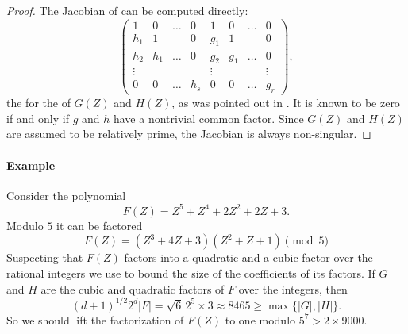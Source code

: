 \begin{proof}
The Jacobian of  can be computed directly:
\[
\left(
\begin{array}{cccccccc}
  1 &   0 & \ldots &   0 &   1 &   0 & \ldots & 0 \\
h_1 &   1 &        &   0 & g_1 &   1 &        & 0 \\
h_2 & h_1 & \ldots &   0 & g_2 & g_1 & \ldots & 0 \\
\vdots&   &        &     & \vdots&   &        &\vdots\\
0   &   0 & \ldots & h_s & 0   &   0 & \ldots &g_r
\end{array}
\right),
\]
the  for the  of $G(Z)$ and
$H(Z)$, as was pointed out in .  It is
known to be zero if and only if $g$ and $h$ have a nontrivial common
factor.  Since $G(Z)$ and $H(Z)$ are assumed to be relatively prime,
the Jacobian is always non-singular.
\end{proof}

\paragraph{Example}

Consider the polynomial 
\[
F(Z) = Z^5 +Z^4 + 2Z^2 + 2Z + 3.
\]
Modulo $5$ it can be factored
\begin{equation}\label{Hensel:Ex5:Eq}
F(Z) = (Z^3 + 4Z + 3) (Z^2 + Z + 1) \pmod{5}
\end{equation}
Suspecting that $F(Z)$ factors into a quadratic and a cubic factor
over the rational integers we use  to
bound the size of the coefficients of its factors.  If $G$ and $H$ are
the cubic and quadratic factors of $F$ over the integers, then
\[
(d+1)^{1/2} 2^d |F| = \sqrt{6}\, 2^5\times 3 \approx 8465 \ge \max \{
|G|, |H|\}.
\]
So we should lift the factorization of $F(Z)$ to one modulo $5^7 > 2
\times 9000$.

